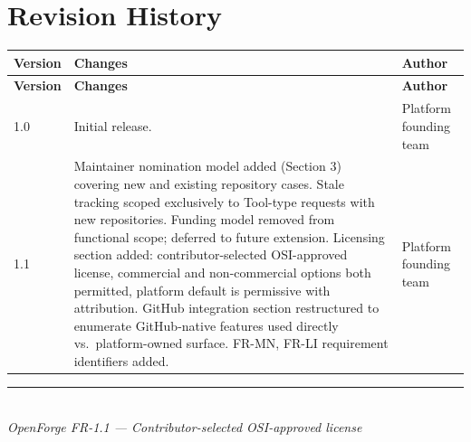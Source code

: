 \documentclass[12pt,a4paper]{article}
\begin{document}
\section{Revision History}
\begin{longtable}{L{1.5cm} L{8.5cm} L{3.3cm}}
  \color{white}\bfseries Version & \color{white}\bfseries Changes & \color{white}\bfseries Author \\
  \endfirsthead
  \color{white}\bfseries Version & \color{white}\bfseries Changes & \color{white}\bfseries Author \\
  \endhead{} & Initial release. & Platform founding team \\
  1.1 & Maintainer nomination model added (Section 3) covering new and existing repository cases. Stale tracking scoped exclusively to Tool-type requests with new repositories. Funding model removed from functional scope; deferred to future extension. Licensing section added: contributor-selected OSI-approved license, commercial and non-commercial options both permitted, platform default is permissive with attribution. GitHub integration section restructured to enumerate GitHub-native features used directly vs.\ platform-owned surface. FR-MN, FR-LI requirement identifiers added. & Platform founding team \\
  \hline
\end{longtable}

\vfill
\begin{center}
\color{ofrule}\rule{0.5\textwidth}{0.4pt}\\[0.5em]
{\small\color{ofgray}\itshape OpenForge FR-1.1 --- Contributor-selected OSI-approved license}
\end{center}
\end{document}
